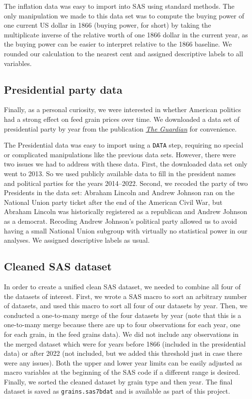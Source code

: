 \documentclass[11pt]{article}
\begin{document}
The inflation data was easy to import into SAS using standard methods. The
only manipulation we made to this data set was to compute the buying power of
one current US dollar in 1866 (buying power, for short) by taking the
multiplicate inverse of the relative worth of one 1866 dollar in the current
year, as the buying power can be easier to interpret relative to the 1866
baseline. We rounded our calculation to the nearest cent and assigned
descriptive labels to all variables.

\subsection*{Presidential party data}

Finally, as a personal curiosity, we were interested in whether American
politics had a strong effect on feed grain prices over time. We downloaded a
data set of presidential party by year from the publication
\href{https://www.theguardian.com/news/datablog/2012/oct/15/us-presidents-listed#data}{\textit{The
 Guardian}} for convenience.

The Presidential data was easy to import using a \texttt{DATA} step, requiring
no special or complicated manipulations like the previous data sets. However,
there were two issues we had to address with these data. First, the downloaded
data set only went to 2013. So we used publicly available
data to fill in the president names and political parties for the years
2014--2022. Second, we recoded the party of two Presidents in the data set:
Abraham Lincoln and Andrew Johnson ran on the National Union party ticket after
the end of the American Civil War, but Abraham Lincoln was historically
registered as
a republican and Andrew Johnson as a democrat. Recoding Andrew Johnson's
political party allowed us to avoid having a small National Union subgroup with
virtually no statistical power in our analyses. We assigned descriptive labels
as usual.

\subsection*{Cleaned SAS dataset}

In order to create a unified clean SAS dataset, we needed to combine all four
of the datasets of interest. First, we wrote a SAS macro to sort an arbitrary
number of datasets, and used this macro to sort all four of our datasets by
year. Then, we conducted a one-to-many merge of the four datasets by year (note
that this is a one-to-many merge because there are up to four observations for
each year, one for each grain, in the feed grains data). We did not include any
observations in the merged dataset which were for years before 1866 (included
in the presidential data) or after 2022 (not included, but we added this
threshold just in case there were any issues). Both the upper and lower year
limits can be easily adjusted as macro variables at the beginning of the SAS
code if a different range is desired. Finally, we sorted the cleaned dataset by
grain type and then year. The final dataset is saved as
\texttt{grains.sas7bdat} and is available as part of this project.
\end{document}
